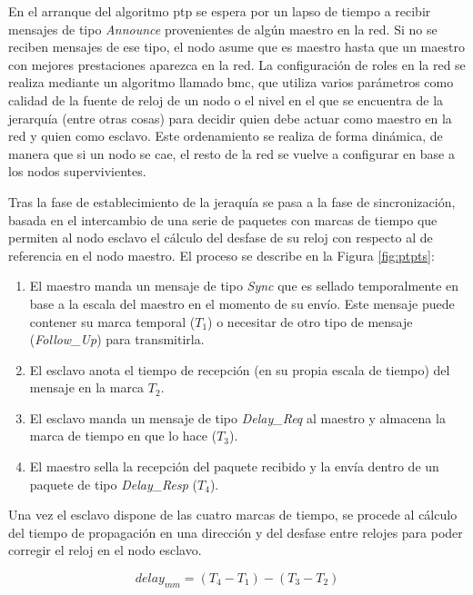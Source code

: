 En el arranque del algoritmo \gls{ptp} se espera por un lapso de tiempo a 
recibir mensajes de tipo \textit{Announce} provenientes de algún maestro en la 
red. Si no se reciben mensajes de ese tipo, el nodo asume que es maestro hasta 
que un maestro con mejores prestaciones aparezca en la red. La configuración de 
roles en la red se realiza mediante un algoritmo llamado \gls{bmc}, que utiliza 
varios parámetros como calidad de la fuente de reloj de un nodo o el nivel en 
el que se encuentra de la jerarquía (entre otras cosas) para decidir quien debe 
actuar como maestro en la red y quien como esclavo. Este ordenamiento se 
realiza de forma dinámica, de manera que si un nodo se cae, el resto de la red 
se vuelve a configurar en base a los nodos supervivientes.

Tras la fase de establecimiento de la jeraquía se pasa a la fase de 
sincronización, basada en el intercambio de una serie de paquetes 
con marcas de tiempo que permiten al nodo esclavo el cálculo del desfase de su 
reloj con respecto al de referencia en el nodo maestro. El proceso se describe 
en la Figura \ref{fig:ptpts}:

\begin{enumerate}
	\item El maestro manda un mensaje de tipo \textit{Sync} que es sellado 
	temporalmente en base a la escala del maestro en el momento de su envío. 
	Este mensaje puede contener su marca temporal ($T_1$) o necesitar de otro 
	tipo de 
	mensaje (\textit{Follow\_Up}) para transmitirla.
	
	\item El esclavo anota el tiempo de recepción (en su propia escala de 
	tiempo) del mensaje en la marca $T_2$.
	
	\item El esclavo manda un mensaje de tipo \textit{Delay\_Req} al maestro y 
	almacena la marca de tiempo en que lo hace ($T_3$).
	
	\item El maestro sella la recepción del paquete recibido y la envía dentro 
	de un paquete de tipo \textit{Delay\_Resp} ($T_4$).
\end{enumerate}

Una vez el esclavo dispone de las cuatro marcas de tiempo, se procede al 
cálculo del tiempo de propagación en una dirección y del desfase entre relojes 
para poder corregir el reloj en el nodo esclavo.

\begin{equation}\label{delmm}
delay_{mm} = (T_4 - T_1) - (T_3 - T_2)
\end{equation}

